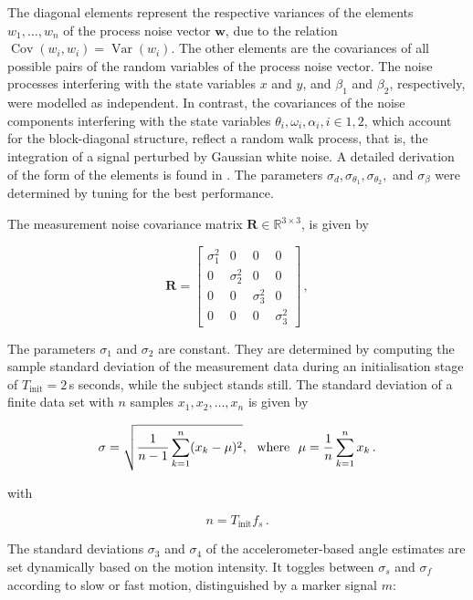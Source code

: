 \noindent
The diagonal elements represent the respective variances of the elements $w_1, \dots, w_n$ of the process noise vector $\mathbf{w}$, due to the relation $\operatorname{Cov}(w_i,w_i) = \operatorname{Var}(w_i)$. The other elements are the covariances of all possible pairs of the random variables of the process noise vector. The noise processes interfering with the state variables $x$ and $y$, and $\beta_1$ and $\beta_2$, respectively, were modelled as independent. In contrast, the covariances of the noise components interfering with the state variables $\theta_i, \omega_i, \alpha_i, i \in {1, 2}$, which account for the block-diagonal structure, reflect a random walk process, that is, the integration of a signal perturbed by Gaussian white noise. A detailed derivation of the form of the elements is found in \cite{Kelly_1994_random}. The parameters $\sigma_d, \sigma_{\theta_1}, \sigma_{\theta_2},$ and $\sigma_{\beta}$ were determined by tuning for the best performance.

The measurement noise covariance matrix $\mathbf{R} \in \mathbb{R}^{3 \times 3}$, is given by

\begin{equation}
\mathbf{R} = \begin{bmatrix}
  \sigma^2_1 & 0 & 0 & 0\\
  0 & \sigma^2_2 & 0 & 0\\
  0 & 0 & \sigma^2_3 & 0\\
  0 & 0 & 0 & \sigma^2_3
\end{bmatrix}\,,
\end{equation}

The parameters $\sigma_1$ and $\sigma_2$ are constant. They are determined by computing the sample standard deviation of the measurement data during an initialisation stage of $T_{\text{init}} = 2$\,s seconds, while the subject stands still. The standard deviation of a finite data set with $n$ samples $x_1, x_2, \dots, x_n$ is given by

\begin{equation}
  \sigma = \sqrt{\frac{1}{n-1} \sum_{k=1}^n (x_k - \mu)^2}, {\rm \ \ where\ \ } \mu = \frac{1}{n} \sum_{k=1}^n x_k\,.
\end{equation}

\noindent
with

\begin{equation}
  n = T_{\text{init}} f_s\,.
\end{equation}


\noindent
The standard deviations $\sigma_3$ and $\sigma_4$ of the accelerometer-based angle estimates are set dynamically based on the motion intensity. It toggles between $\sigma_s$ and $\sigma_f$ according to slow or fast motion, distinguished by a marker signal $m$:

